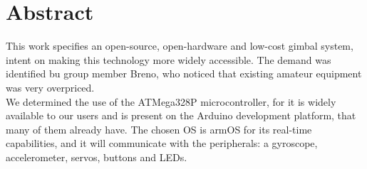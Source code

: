 \chapter*{Abstract}


\noindent This work specifies an open-source, open-hardware and low-cost gimbal system, intent on making this technology more widely accessible. The demand was identified bu group member Breno, who noticed that existing amateur equipment was very overpriced.\\
We determined the use of the ATMega328P microcontroller, for it is widely available to our users and is present on the Arduino development platform, that many of them already have. The chosen OS is armOS for its real-time capabilities, and it will communicate with the peripherals: a gyroscope, accelerometer, servos, buttons and LEDs.